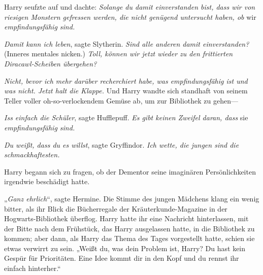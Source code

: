 Harry seufzte auf und dachte: \emph{Solange du damit einverstanden bist, dass wir von riesigen Monstern gefressen werden, die nicht genügend untersucht haben, ob} wir \emph{empfindungsfähig sind.}

\emph{Damit kann ich leben}, sagte Slytherin. \emph{Sind alle anderen damit einverstanden?} (Inneres mentales nicken.) \emph{Toll, können wir jetzt wieder zu den frittierten} \emph{Diracawl-Scheiben übergehen?}

\emph{Nicht, bevor ich mehr darüber recherchiert habe, was empfindungsfähig ist und was nicht. Jetzt halt die Klappe.} Und Harry wandte sich standhaft von seinem Teller voller oh-so-verlockendem Gemüse ab, um zur Bibliothek zu gehen—

\emph{Iss einfach die Schüler}, sagte Hufflepuff. \emph{Es gibt keinen Zweifel daran, dass} sie \emph{empfindungsfähig sind.}

\emph{Du weißt, dass du es willst}, sagte Gryffindor. \emph{Ich wette, die jungen sind die schmackhaftesten.}

Harry begann sich zu fragen, ob der Dementor seine imaginären Persönlichkeiten irgendwie beschädigt hatte.

\later

„\emph{Ganz ehrlich}“, sagte Hermine. Die Stimme des jungen Mädchens klang ein wenig bitter, als ihr Blick die Bücherregale der Kräuterkunde-Magazine in der Hogwarts-Bibliothek überflog. Harry hatte ihr eine Nachricht hinterlassen, mit der Bitte nach dem Frühstück, das Harry ausgelassen hatte, in die Bibliothek zu kommen; aber dann, als Harry das Thema des Tages vorgestellt hatte, schien sie etwas verwirrt zu sein. „Weißt du, was dein Problem ist, Harry? Du hast kein Gespür für Prioritäten. Eine Idee kommt dir in den Kopf und du rennst ihr einfach hinterher.“


